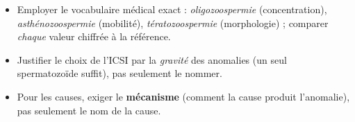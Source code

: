 \documentclass[11pt]{article}
\begin{document}
\begin{attention}
\begin{itemize}
\item Employer le vocabulaire médical exact : \emph{oligozoospermie} (concentration), \emph{asthénozoospermie} (mobilité), \emph{tératozoospermie} (morphologie) ; comparer \emph{chaque} valeur chiffrée à la référence.
\item Justifier le choix de l'ICSI par la \emph{gravité} des anomalies (un seul spermatozoïde suffit), pas seulement le nommer.
\item Pour les causes, exiger le \textbf{mécanisme} (comment la cause produit l'anomalie), pas seulement le nom de la cause.
\end{itemize}
\end{attention}
\end{document}
